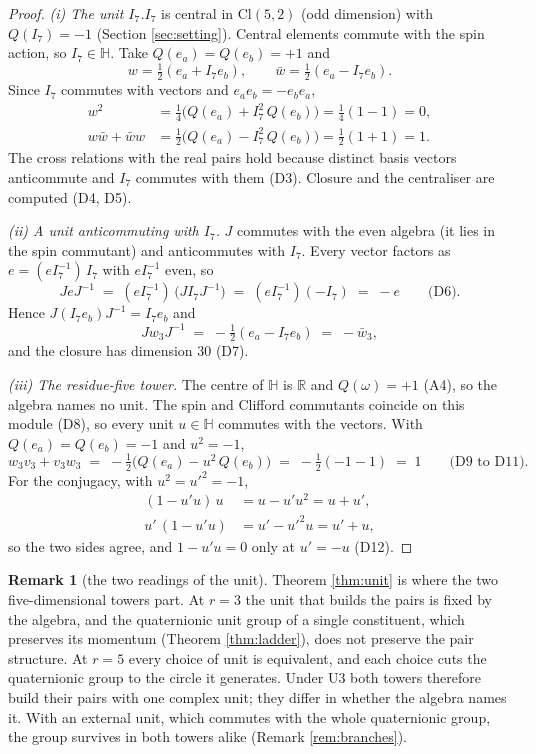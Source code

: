 \documentclass[11pt]{article}
\theoremstyle{definition}
\newtheorem{remark}[theorem]{Remark}
\newcommand{\Cl}{\mathrm{Cl}}
\newcommand{\R}{\mathbb{R}}
\newcommand{\HH}{\mathbb{H}}
\newcommand{\pstep}[1]{\par\smallskip\noindent\textit{#1.}\enspace}
\begin{document}
\begin{proof}
\textit{(i) The unit $I_{7}$.}\enspace $I_{7}$ is central in $\Cl(5,2)$ (odd dimension) with $Q(I_{7}) = -1$ (Section \ref{sec:setting}). Central elements commute with the spin action, so $I_{7} \in \HH$. Take $Q(e_{a}) = Q(e_{b}) = +1$ and
\[
w = \tfrac{1}{2}(e_{a} + I_{7}e_{b}), \qquad \bar{w} = \tfrac{1}{2}(e_{a} - I_{7}e_{b}).
\]
Since $I_{7}$ commutes with vectors and $e_{a}e_{b} = -e_{b}e_{a}$,
\begin{align*}
w^{2} &= \tfrac{1}{4}\bigl(Q(e_{a}) + I_{7}^{2}\,Q(e_{b})\bigr) = \tfrac{1}{4}(1 - 1) = 0, \\
w\bar{w} + \bar{w}w &= \tfrac{1}{2}\bigl(Q(e_{a}) - I_{7}^{2}\,Q(e_{b})\bigr) = \tfrac{1}{2}(1 + 1) = 1.
\end{align*}
The cross relations with the real pairs hold because distinct basis vectors anticommute and $I_{7}$ commutes with them (D3). Closure and the centraliser are computed (D4, D5).

\pstep{(ii) A unit anticommuting with $I_{7}$} $J$ commutes with the even algebra (it lies in the spin commutant) and anticommutes with $I_{7}$. Every vector factors as $e = (eI_{7}^{-1})\,I_{7}$ with $eI_{7}^{-1}$ even, so
\[
JeJ^{-1} \;=\; (eI_{7}^{-1})\,\bigl(JI_{7}J^{-1}\bigr) \;=\; (eI_{7}^{-1})(-I_{7}) \;=\; -e \qquad \text{(D6)}.
\]
Hence $J(I_{7}e_{b})J^{-1} = I_{7}e_{b}$ and
\[
Jw_{3}J^{-1} \;=\; -\tfrac{1}{2}(e_{a} - I_{7}e_{b}) \;=\; -\bar{w}_{3},
\]
and the closure has dimension $30$ (D7).

\pstep{(iii) The residue-five tower} The centre of $\HH$ is $\R$ and $Q(\omega) = +1$ (A4), so the algebra names no unit. The spin and Clifford commutants coincide on this module (D8), so every unit $u \in \HH$ commutes with the vectors. With $Q(e_{a}) = Q(e_{b}) = -1$ and $u^{2} = -1$,
\[
w_{3}v_{3} + v_{3}w_{3} \;=\; -\tfrac{1}{2}\bigl(Q(e_{a}) - u^{2}\,Q(e_{b})\bigr) \;=\; -\tfrac{1}{2}(-1 - 1) \;=\; 1 \qquad \text{(D9 to D11)}.
\]
For the conjugacy, with $u^{2} = u'^{2} = -1$,
\begin{align*}
(1 - u'u)\,u &= u - u'u^{2} = u + u', \\
u'\,(1 - u'u) &= u' - u'^{2}u = u' + u,
\end{align*}
so the two sides agree, and $1 - u'u = 0$ only at $u' = -u$ (D12).
\end{proof}

\begin{remark}[the two readings of the unit]\label{rem:units}
Theorem \ref{thm:unit} is where the two five-dimensional towers part. At $r = 3$ the unit that builds the pairs is fixed by the algebra, and the quaternionic unit group of a single constituent, which preserves its momentum (Theorem \ref{thm:ladder}), does not preserve the pair structure. At $r = 5$ every choice of unit is equivalent, and each choice cuts the quaternionic group to the circle it generates. Under U3 both towers therefore build their pairs with one complex unit; they differ in whether the algebra names it. With an external unit, which commutes with the whole quaternionic group, the group survives in both towers alike (Remark \ref{rem:branches}).
\end{remark}
\end{document}
